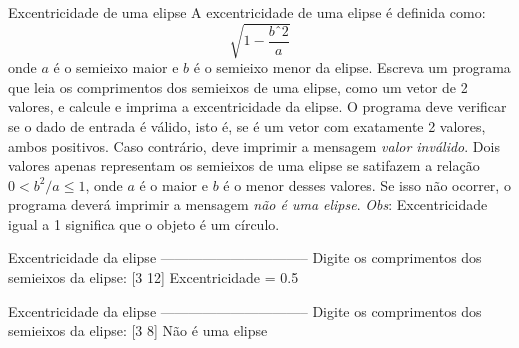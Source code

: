 \documentclass[11pt,fleqn]{practice}
\begin{document}
\begin{task}{Excentricidade de uma elipse}{}
 A excentricidade de uma  elipse é definida como:
\[ \sqrt{1 - \frac{bˆ2}{a}} \]
onde $a$ é o semieixo maior e $b$ é o semieixo menor da elipse.  Escreva um programa que leia os comprimentos dos semieixos de uma elipse, como um vetor de 2 valores, e calcule e imprima a excentricidade da elipse. O programa deve verificar se o dado de entrada é válido, isto é, se é um vetor com exatamente 2 valores, ambos positivos. Caso contrário, deve imprimir a mensagem \emph{valor inválido\/}. Dois valores apenas representam os semieixos de uma elipse se satifazem a relação $0 < b^2/a \leq 1$, onde $a$ é o maior e $b$ é o menor desses valores. Se isso não ocorrer, o programa deverá imprimir a mensagem \emph{não é uma elipse}.  \emph{Obs\/}: Excentricidade igual a 1 significa que o objeto é um círculo. 

  \begin{runexample}
Excentricidade da elipse
--------------------------------
Digite os comprimentos dos semieixos da elipse: [3 12]
Excentricidade = 0.5 
\end{runexample}

  \begin{runexample}
Excentricidade da elipse
--------------------------------
Digite os comprimentos dos semieixos da elipse: [3 8]
Não é uma elipse 
\end{runexample}
 
 \tcblower
  \solution
\end{task}
\end{document}
